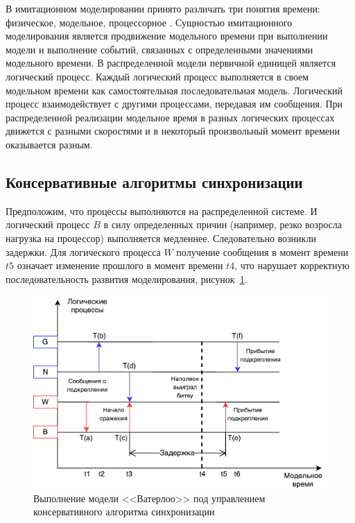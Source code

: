 В имитационном моделировании принято различать три понятия времени: физическое, модельное, процессорное \cite{okol}. Сущностью имитационного моделирования является продвижение модельного времени при выполнении модели и выполнение событий, связанных с определенными значениями модельного времени. В распределенной модели первичной единицей является логический процесс. Каждый логический процесс выполняется в своем модельном времени как самостоятельная последовательная модель. Логический процесс взаимодействует с другими процессами, передавая им сообщения. При распределенной реализации модельное время в разных логических процессах движется с разными скоростями и в некоторый произвольный момент времени оказывается разным.


\subsection{Консервативные алгоритмы синхронизации} \label{subsect1}

Предположим, что процессы выполняются на распределенной системе. И логический процесс $B$ в силу определенных причин (например, резко возросла нагрузка на процессор) выполняется медленнее. Следовательно возникли задержки. Для логического процесса $W$ получение сообщения в момент времени $t5$ означает изменение прошлого в момент времени $t4$, что нарушает корректную последовательность развития моделирования, рисунок~\ref{fig:Выполнение модели <<Ватерлоо>> под управлением консервативного алгоритма синхронизации}.

\begin{figure}[!ht]
\centering
\includegraphics[scale=1]{images/waterloo-kas.pdf}
\caption{Выполнение модели <<Ватерлоо>> под управлением консервативного алгоритма синхронизации}
\label{fig:Выполнение модели <<Ватерлоо>> под управлением консервативного алгоритма синхронизации}
\end{figure}

